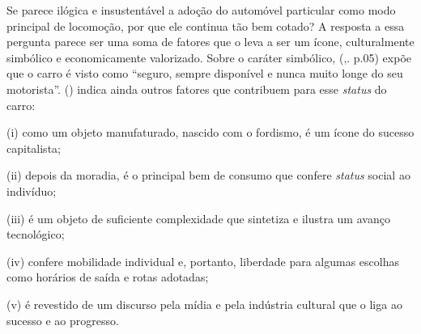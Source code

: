 \begin{table}[htb]
\end{table}

Se parece ilógica e insustentável a adoção do automóvel particular como modo principal de locomoção, por que ele continua tão bem cotado? A resposta a essa pergunta parece ser uma soma de fatores que o leva a ser um ícone, culturalmente simbólico e economicamente valorizado. 
Sobre o caráter simbólico,  (\citeyear{BANISTER2005},. p.05) expõe que o carro é visto como ``seguro, sempre disponível e nunca muito longe do seu motorista''.  (\citeyear{URRY2001}) indica ainda outros fatores que contribuem para esse \emph{status} do carro: 
\begin{compactitem}[]
\item (i) como um objeto manufaturado, nascido com o fordismo, é um ícone do sucesso capitalista; 
\item (ii) depois da moradia, é o principal bem de consumo que confere \emph{status} social ao indivíduo;
\item (iii) é um objeto de suficiente complexidade que sintetiza e ilustra um avanço tecnológico;
\item (iv) confere mobilidade individual e, portanto, liberdade para algumas escolhas como horários de saída e rotas adotadas;
\item (v) é revestido de um discurso pela mídia e pela indústria cultural que o liga ao sucesso e ao progresso.
\end{compactitem}

